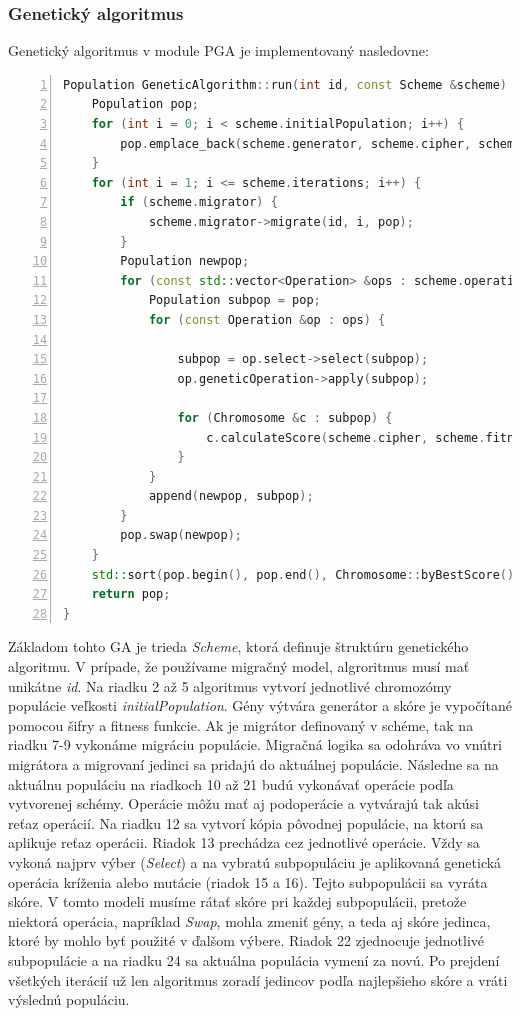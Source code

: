 \subsubsection{Genetický algoritmus}
Genetický algoritmus v module PGA je implementovaný nasledovne:
\begin{lstlisting}[language={c++}, caption={Genetický algoritmus}, numbers=left]
Population GeneticAlgorithm::run(int id, const Scheme &scheme) {
    Population pop;
    for (int i = 0; i < scheme.initialPopulation; i++) {
        pop.emplace_back(scheme.generator, scheme.cipher, scheme.fitness);
    }
    for (int i = 1; i <= scheme.iterations; i++) {
        if (scheme.migrator) {
            scheme.migrator->migrate(id, i, pop);
        }
        Population newpop;
        for (const std::vector<Operation> &ops : scheme.operations) {
            Population subpop = pop;
            for (const Operation &op : ops) {
          
                subpop = op.select->select(subpop);
                op.geneticOperation->apply(subpop);
          
                for (Chromosome &c : subpop) {
                    c.calculateScore(scheme.cipher, scheme.fitness, scheme.cache);
                }
            }
            append(newpop, subpop);
        }
        pop.swap(newpop);
    }
    std::sort(pop.begin(), pop.end(), Chromosome::byBestScore());
    return pop;
}
\end{lstlisting}
Základom tohto GA je trieda \textit{Scheme}, ktorá definuje štruktúru genetického algoritmu. V prípade, že používame migračný model, algroritmus musí mať unikátne \textit{id}.
Na riadku 2 až 5 algoritmus vytvorí jednotlivé chromozómy populácie veľkosti \textit{initialPopulation}. Gény výtvára generátor a skóre je vypočítané pomocou šifry a fitness funkcie.
Ak je migrátor definovaný v schéme, tak na riadku 7-9 vykonáme migráciu populácie. Migračná logika sa odohráva vo vnútri migrátora a migrovaní jedinci sa pridajú do aktuálnej populácie. Následne sa na aktuálnu populáciu na riadkoch 10 až 21 budú vykonávať operácie podľa vytvorenej schémy. Operácie môžu mať aj podoperácie a vytvárajú tak akúsi reťaz operácií. Na riadku 12 sa vytvorí kópia pôvodnej populácie, na ktorú sa aplikuje reťaz operácii. Riadok 13 prechádza cez jednotlivé operácie. Vždy sa vykoná najprv výber (\textit{Select}) a na vybratú subpopuláciu je aplikovaná genetická operácia kríženia alebo mutácie (riadok 15 a 16). Tejto subpopulácii sa vyráta skóre. V tomto modeli musíme rátať skóre pri každej subpopulácii, pretože niektorá operácia, napríklad \textit{Swap}, mohla zmeniť gény, a teda aj skóre jedinca, ktoré by mohlo byť použité v ďalšom výbere. Riadok 22 zjednocuje jednotlivé subpopulácie a na riadku 24 sa aktuálna populácia vymení za novú. Po prejdení všetkých iterácií už len algoritmus zoradí jedincov podľa najlepšieho skóre a vráti výslednú populáciu.

